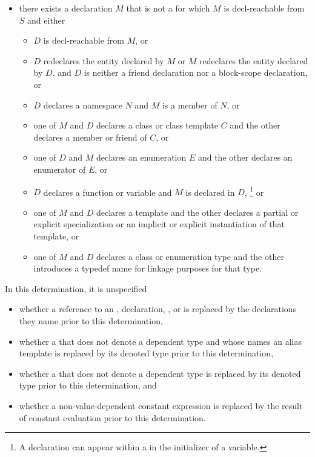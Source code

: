 \begin{std.txt}
\begin{itemize}
\item
there exists a declaration $M$ that is not a 
for which $M$ is decl-reachable from $S$ and either
\begin{itemize}
\item
$D$ is decl-reachable from $M$, or
\item
$D$ redeclares the entity declared by $M$ or
$M$ redeclares the entity declared by $D$,
and $D$ is neither a friend declaration
nor a block-scope declaration, or
\item
$D$ declares a namespace $N$ and $M$ is a member of $N$, or
\item
one of $M$ and $D$ declares a class or class template $C$
and the other declares a member or friend of $C$, or
\item
one of $D$ and $M$ declares an enumeration $E$
and the other declares an enumerator of $E$, or
\item
$D$ declares a function or variable and $M$ is declared in $D$,%
\footnote{A declaration can appear within a 
in the initializer of a variable.} or
\item
one of $M$ and $D$ declares a template and the other declares
a partial or explicit specialization or
an implicit or explicit instantiation of that template, or
\item 
one of $M$ and $D$ declares a class or enumeration type
and the other introduces a typedef name for linkage purposes for that type.
\end{itemize}
\end{itemize}
In this determination, it is unspecified
\begin{itemize}
\item
whether a reference to an
,
 declaration,
, or
is replaced by the declarations they name
prior to this determination,

\item
whether a 
that does not denote a dependent type
and whose  names an alias template
is replaced by its denoted type
prior to this determination,

\item
whether a 
that does not denote a dependent type
is replaced by its denoted type
prior to this determination,
and

\item
whether a non-value-dependent constant expression
is replaced by the result of constant evaluation
prior to this determination.
\end{itemize}


\end{std.txt}
